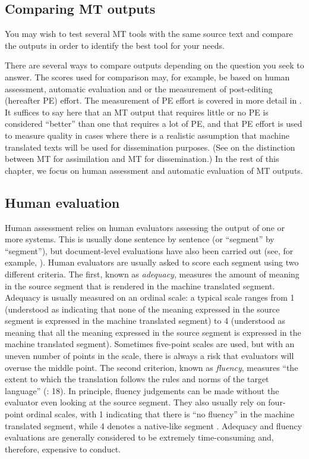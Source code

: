 \documentclass[output=paper]{langscibook}
\begin{document}
\subsection{Comparing MT outputs}\largerpage

You may wish to test several MT tools with the same source text and compare the outputs in order to identify the best tool for your needs.

There are several ways to compare outputs depending on the question you seek to answer. The scores used for comparison may, for example, be based on human assessment, automatic evaluation and or the measurement of post-editing (hereafter PE) effort. The measurement of PE effort is covered in more detail in . It suffices to say here that an MT output that requires little or no PE is considered “better” than one that requires a lot of PE, and that PE effort is used to measure quality in cases where there is a realistic assumption that machine translated texts will be used for dissemination purposes. (See  on the distinction between MT for assimilation and MT for dissemination.) In the rest of this chapter, we focus on human assessment and automatic evaluation of MT outputs.

\subsection{Human evaluation}

Human assessment relies on human evaluators assessing the output of one or more systems.  This is usually done sentence by sentence (or “segment” by “segment”), but document-level evaluations have also been carried out (see, for example, \citealt{Castilho2020}). Human evaluators are usually asked to score each segment using two different criteria. The first, known as \textit{adequacy}, measures the amount of meaning in the source segment that is rendered in the machine translated segment. Adequacy is usually measured on an ordinal scale: a typical scale ranges from 1 (understood as indicating that none of the meaning expressed in the source segment is expressed in the machine translated segment) to 4 (understood as meaning that all the meaning expressed in the source segment is expressed in the machine translated segment). Sometimes five-point scales are used, but with an uneven number of points in the scale, there is always a risk that evaluators will overuse the middle point. The second criterion, known as \textit{fluency}, measures “the extent to which the translation follows the rules and norms of the target language” (\citealt{CastilhoMoorkens2018}: 18). In principle, fluency judgements can be made without the evaluator even looking at the source segment. They also usually rely on four-point ordinal scales, with 1 indicating that there is “no fluency” in the machine translated segment, while 4 denotes a native-like segment \citep[1152-1153]{Castilho2020}. Adequacy and fluency evaluations are generally considered to be extremely time-consuming and, therefore, expensive to conduct. 
\end{document}

